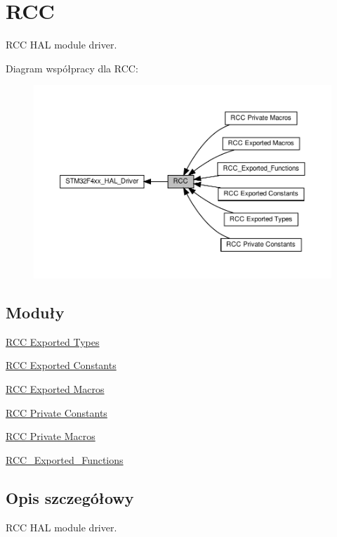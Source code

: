\hypertarget{group___r_c_c}{}\section{R\+CC}
\label{group___r_c_c}


R\+CC H\+AL module driver.  


Diagram współpracy dla R\+CC\+:\nopagebreak
\begin{figure}[H]
\begin{center}
\leavevmode
\includegraphics[width=350pt]{group___r_c_c}
\end{center}
\end{figure}
\subsection*{Moduły}
\begin{DoxyCompactItemize}
\item 
\hyperlink{group___r_c_c___exported___types}{R\+C\+C Exported Types}
\item 
\hyperlink{group___r_c_c___exported___constants}{R\+C\+C Exported Constants}
\item 
\hyperlink{group___r_c_c___exported___macros}{R\+C\+C Exported Macros}
\item 
\hyperlink{group___r_c_c___private___constants}{R\+C\+C Private Constants}
\item 
\hyperlink{group___r_c_c___private___macros}{R\+C\+C Private Macros}
\item 
\hyperlink{group___r_c_c___exported___functions}{R\+C\+C\+\_\+\+Exported\+\_\+\+Functions}
\end{DoxyCompactItemize}


\subsection{Opis szczegółowy}
R\+CC H\+AL module driver. 

